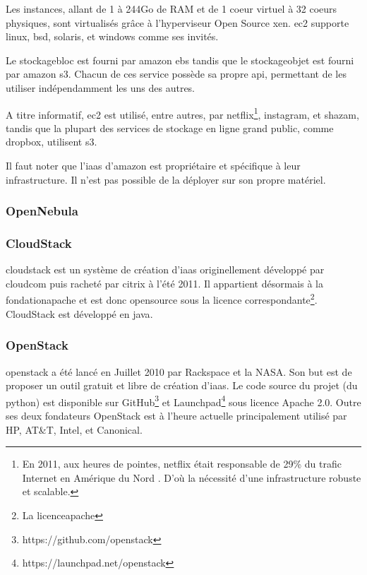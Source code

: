 \documentclass[a4paper,oneside]{report}
\begin{document}
Les instances, allant de 1 à 244Go de RAM et de 1 \gls{coeur} virtuel à 32 \glspl{coeur} physiques, sont virtualisés grâce à l'hyperviseur Open Source \gls{xen}.
\gls{ec2} supporte \gls{linux}, \gls{bsd}, \gls{solaris}, et \gls{windows} comme \glspl{se} invités.

Le \gls{stockagebloc} est fourni par \gls{amazon} \gls{ebs} tandis que le \gls{stockageobjet} est fourni par \gls{amazon} \gls{s3}.
Chacun de ces service possède sa propre \gls{api}, permettant de les utiliser indépendamment les uns des autres.

A titre informatif, \gls{ec2} est utilisé, entre autres, par \gls{netflix}\footnote{En 2011, aux heures de pointes, \gls{netflix} était responsable de 29\% du trafic Internet en Amérique du Nord \cite{NetflixTrafic}. D'où la nécessité d'une infrastructure robuste et scalable.}, \gls{instagram}, et \gls{shazam}, tandis que la plupart des services de stockage en ligne grand public, comme \gls{dropbox}, utilisent \gls{s3}.

Il faut noter que l'\gls{iaas} d'\gls{amazon} est propriétaire et spécifique à leur infrastructure. Il n'est pas possible de la déployer sur son propre matériel.

\subsubsection{OpenNebula}

\subsubsection{CloudStack}
\gls{cloudstack} est un système de création d'\gls{iaas} originellement développé par \gls{cloudcom} puis racheté par \gls{citrix} à l'été 2011.
Il appartient désormais à la \gls{fondationapache} et est donc \gls{opensource} sous la licence correspondante\footnote{La \gls{licenceapache}}.\newline
CloudStack est développé en \gls{java}.

\subsubsection{OpenStack}
\gls{openstack} a été lancé en Juillet 2010 par Rackspace et la NASA.
Son but est de proposer un outil gratuit et libre de création d'\gls{iaas}.
Le code source du projet (du \gls{python}) est disponible sur GitHub\footnote{https://github.com/openstack} et Launchpad\footnote{https://launchpad.net/openstack} sous licence Apache 2.0.\newline
Outre ses deux fondateurs OpenStack est à l'heure actuelle principalement utilisé par HP, AT\&T, Intel, et Canonical.
\end{document}
